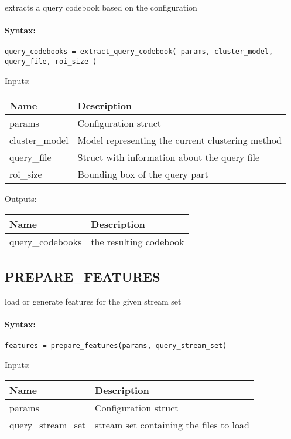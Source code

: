 extracts a query codebook based on the configuration

\paragraph{Syntax:} \verb|query_codebooks = extract_query_codebook( params, cluster_model, query_file, roi_size )|

\bigskip
Inputs:

\begin{tabular}{|p{}|p{}|}
\hline
\textbf{Name} & \textbf{Description} \\
\hline \hline
params & Configuration struct  \\ \hline
cluster\_model & Model representing the current clustering method  \\ \hline
query\_file & Struct with information about the query file  \\ \hline
roi\_size & Bounding box of the query part  \\ \hline
\end{tabular}

\bigskip
Outputs:

\begin{tabular}{|p{}|p{}|}
\hline
\textbf{Name} & \textbf{Description} \\
\hline \hline
query\_codebooks & the resulting codebook  \\ \hline
\end{tabular}

\subsection{PREPARE\_FEATURES}

load or generate features for the given stream set

\paragraph{Syntax:} \verb|features = prepare_features(params, query_stream_set)|

\bigskip
Inputs:

\begin{tabular}{|p{}|p{}|}
\hline
\textbf{Name} & \textbf{Description} \\
\hline \hline
params & Configuration struct  \\ \hline
query\_stream\_set & stream set containing the files to load  \\ \hline
\end{tabular}

